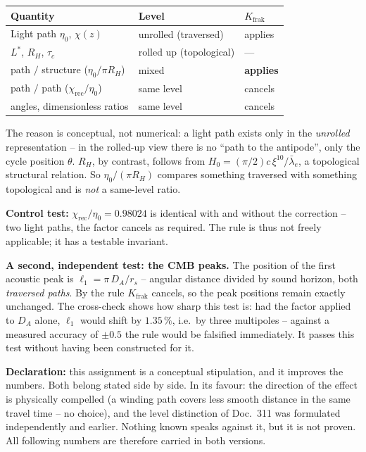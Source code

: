 \begin{center}
\begin{tabular}{lll}
\toprule
Quantity & Level & $K_\text{frak}$ \\
\midrule
Light path $\eta_0$, $\chi(z)$ & unrolled (traversed) & applies \\
$L^{*}$, $R_H$, $\tau_c$ & rolled up (topological) & --- \\
path $/$ structure ($\eta_0/\pi R_H$) & mixed & \textbf{applies} \\
path $/$ path ($\chi_\text{rec}/\eta_0$) & same level & cancels \\
angles, dimensionless ratios & same level & cancels \\
\bottomrule
\end{tabular}
\end{center}

The reason is conceptual, not numerical: a light path exists only
in the \emph{unrolled} representation -- in the rolled-up view
there is no \enquote{path to the antipode}, only the cycle
position $\theta$. $R_H$, by contrast, follows from
$H_0 = (\pi/2)c\,\xi^{10}/\bar\lambda_e$, a topological
structural relation. So $\eta_0/(\pi R_H)$ compares something
traversed with something topological and is \emph{not} a
same-level ratio.

\textbf{Control test:} $\chi_\text{rec}/\eta_0 = 0.98024$ is
identical with and without the correction -- two light paths, the
factor cancels as required. The rule is thus not freely
applicable; it has a testable invariant.

\textbf{A second, independent test: the CMB peaks.} The position
of the first acoustic peak is $\ell_1 = \pi\,D_A/r_s$ -- angular
distance divided by sound horizon, both \emph{traversed paths}.
By the rule $K_\text{frak}$ cancels, so the peak positions remain
exactly unchanged. The cross-check shows how sharp this test is:
had the factor applied to $D_A$ alone, $\ell_1$ would shift by
$1.35\,\%$, i.e.\ by three multipoles -- against a measured
accuracy of $\pm0.5$ the rule would be falsified immediately. It
passes this test without having been constructed for it.

\textbf{Declaration:} this assignment is a conceptual
stipulation, and it improves the numbers. Both belong stated side
by side. In its favour: the direction of the effect is physically
compelled (a winding path covers less smooth distance in the same
travel time -- no choice), and the level distinction of Doc.~311
was formulated independently and earlier. Nothing known speaks
against it, but it is not proven. All following numbers are
therefore carried in both versions.

